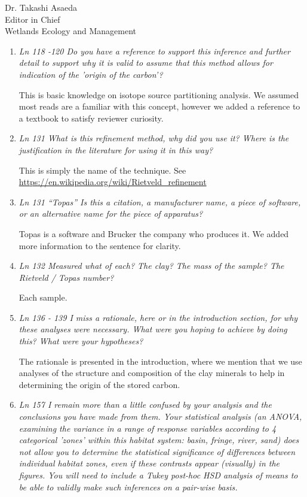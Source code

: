 \documentclass[11pt]{bgcletter}
\begin{document}
\begin{letter}{Dr. Takashi Asaeda\\
 Editor in Chief \\ Wetlands Ecology and Management}
\begin{enumerate}
\item {\it Ln 118 -120 Do you have a reference to support this inference and further detail to support why it is valid to assume that this method allows for indication of the 'origin of the carbon'?}

{\color{blue} This is basic knowledge on isotope source partitioning analysis. We assumed most reads are a familiar with this concept, however we added a reference to a textbook to satisfy reviewer curiosity. }

\item {\it Ln 131 What is this refinement method, why did you use it? Where is the justification in the literature for using it in this way?}

{\color{blue} This is simply the name of the technique. See \url{https://en.wikipedia.org/wiki/Rietveld_refinement}}

\item {\it Ln 131 ``Topas'' Is this a citation, a manufacturer name, a piece of software, or an alternative name for the piece of apparatus?}

{\color{blue} Topas is a software and Brucker the company who produces it. We added more information to the sentence for clarity.}

\item {\it Ln 132 Measured what of each? The clay? The mass of the sample? The Rietveld / Topas number?}

{\color{blue} Each sample.}

\item {\it Ln 136 - 139 I miss a rationale, here or in the introduction section, for why these analyses were necessary. What were you hoping to achieve by doing this? What were your hypotheses?}

{\color{blue} The rationale is presented in the introduction, where we mention that we use analyses of the structure and composition of the clay minerals to help in determining the origin of the stored carbon.}

\item {\it Ln 157 I remain more than a little confused by your analysis and the conclusions you have made from them. Your statistical analysis (an ANOVA, examining the variance in a range of response variables according to 4 categorical 'zones' within this habitat system: basin, fringe, river, sand) does not allow you to determine the statistical significance of differences between individual habitat zones, even if these contrasts appear (visually) in the figures. You will need to include a Tukey post-hoc HSD analysis of means to be able to validly make such inferences on a pair-wise basis.}


\end{enumerate}
\end{letter}
\end{document}
